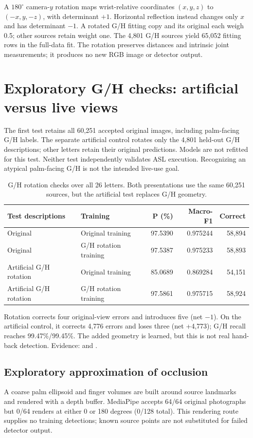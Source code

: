 A $180^\circ$ camera-$y$ rotation maps wrist-relative coordinates $(x,y,z)$ to $(-x,y,-z)$, with determinant $+1$. Horizontal reflection instead changes only $x$ and has determinant $-1$. A rotated G/H fitting copy and its original each weigh 0.5; other sources retain weight one. The 4,801 G/H sources yield 65,052 fitting rows in the full-data fit. The rotation preserves distances and intrinsic joint measurements; it produces no new RGB image or detector output.

\clearpage
\section{Exploratory G/H checks: artificial versus live views}\label{app:ton-live}
The first test retains all 60,251 accepted original images, including palm-facing G/H labels. The separate artificial control rotates only the 4,801 held-out G/H descriptions; other letters retain their original predictions. Models are not refitted for this test. Neither test independently validates ASL execution. Recognizing an atypical palm-facing G/H is not the intended live-use goal.

\begin{table}[h]\centering\small
\caption{G/H rotation checks over all 26 letters. Both presentations use the same 60,251 sources, but the artificial test replaces G/H geometry.}
\begin{tabular}{llrrr}\toprule
Test descriptions & Training & P (\%) & Macro-F1 & Correct\\\midrule
Original & Original training & 97.5390 & 0.975244 & 58,894 \\
Original & G/H rotation training & 97.5387 & 0.975233 & 58,893 \\
Artificial G/H rotation & Original training & 85.0689 & 0.869284 & 54,151 \\
Artificial G/H rotation & G/H rotation training & 97.5861 & 0.975715 & 58,924 \\
\bottomrule\end{tabular}
\end{table}

Rotation corrects four original-view errors and introduces five (net $-1$). On the artificial control, it corrects 4,776 errors and loses three (net +4,773); G/H recall reaches 99.47\%/99.45\%. The added geometry is learned, but this is not real hand-back detection. Evidence:  and .

\subsection{Exploratory approximation of occlusion}
A coarse palm ellipsoid and finger volumes are built around source landmarks and rendered with a depth buffer. MediaPipe accepts 64/64 original photographs but 0/64 renders at either 0 or 180 degrees (0/128 total). This rendering route supplies no training detections; known source points are not substituted for failed detector output.

